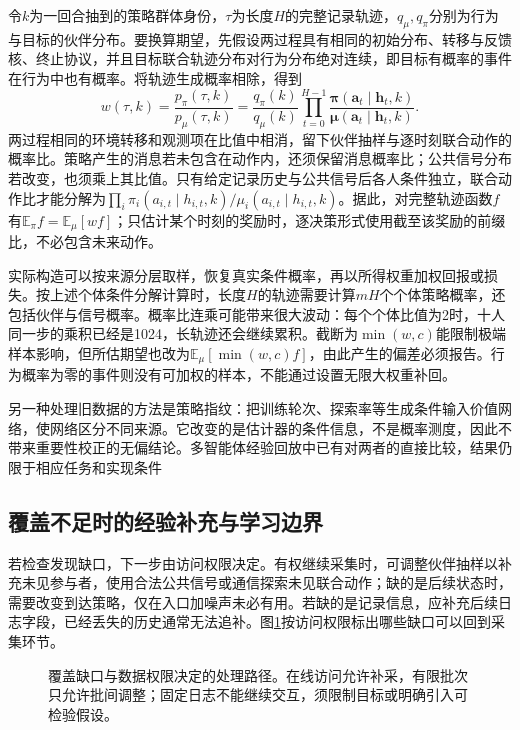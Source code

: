 令$k$为一回合抽到的策略群体身份，$\tau$为长度$H$的完整记录轨迹，$q_\mu,q_\pi$分别为行为与目标的伙伴分布。要换算期望，先假设两过程具有相同的初始分布、转移与反馈核、终止协议，并且目标联合轨迹分布对行为分布绝对连续，即目标有概率的事件在行为中也有概率。将轨迹生成概率相除，得到
\begin{equation}
 w(\tau,k)=\frac{p_\pi(\tau,k)}{p_\mu(\tau,k)}
 =\frac{q_\pi(k)}{q_\mu(k)}
   \prod_{t=0}^{H-1}
   \frac{\bm\pi(\bm a_t\mid\bm h_t,k)}
        {\bm\mu(\bm a_t\mid\bm h_t,k)}.
 \label{eq:rl-multi-agent-is}
\end{equation}
两过程相同的环境转移和观测项在比值中相消，留下伙伴抽样与逐时刻联合动作的概率比。策略产生的消息若未包含在动作内，还须保留消息概率比；公共信号分布若改变，也须乘上其比值。只有给定记录历史与公共信号后各人条件独立，联合动作比才能分解为$\prod_i\pi_i(a_{i,t}\mid h_{i,t},k)/\mu_i(a_{i,t}\mid h_{i,t},k)$。据此，对完整轨迹函数$f$有$\mathbb E_\pi f=\mathbb E_\mu[wf]$；只估计某个时刻的奖励时，逐决策形式使用截至该奖励的前缀比，不必包含未来动作。

实际构造可以按来源分层取样，恢复真实条件概率，再以所得权重加权回报或损失。按上述个体条件分解计算时，长度$H$的轨迹需要计算$mH$个个体策略概率，还包括伙伴与信号概率。概率比连乘可能带来很大波动：每个个体比值为2时，十人同一步的乘积已经是1024，长轨迹还会继续累积。截断为$\min(w,c)$能限制极端样本影响，但所估期望也改为$\mathbb E_\mu[\min(w,c)f]$，由此产生的偏差必须报告。行为概率为零的事件则没有可加权的样本，不能通过设置无限大权重补回。

另一种处理旧数据的方法是策略指纹：把训练轮次、探索率等生成条件输入价值网络，使网络区分不同来源。它改变的是估计器的条件信息，不是概率测度，因此不带来重要性校正的无偏结论。多智能体经验回放中已有对两者的直接比较，结果仍限于相应任务和实现条件

\subsection{覆盖不足时的经验补充与学习边界}
\label{sec:rl-multi-agent-data-boundary}

若检查发现缺口，下一步由访问权限决定。有权继续采集时，可调整伙伴抽样以补充未见参与者，使用合法公共信号或通信探索未见联合动作；缺的是后续状态时，需要改变到达策略，仅在入口加噪声未必有用。若缺的是记录信息，应补充后续日志字段，已经丢失的历史通常无法追补。图\ref{fig:rl-multi-agent-data-loop}按访问权限标出哪些缺口可以回到采集环节。

\begin{figure}[htbp]
 \centering
 
 \caption{覆盖缺口与数据权限决定的处理路径。在线访问允许补采，有限批次只允许批间调整；固定日志不能继续交互，须限制目标或明确引入可检验假设。}
 \label{fig:rl-multi-agent-data-loop}
\end{figure}

